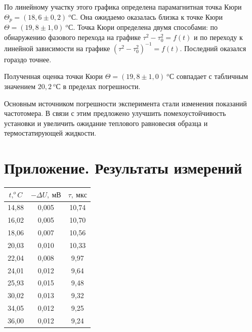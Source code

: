 \documentclass{article}
\begin{document}
	По линейному участку этого графика определена парамагнитная точка Кюри $\Theta_p = (18,6 \pm 0,2) \ ^oС  $. Она ожидаемо оказалась близка к точке Кюри $\Theta = (19,8 \pm 1,0) \ ^oС$. Точка Кюри определена двумя способами: по обнаружению фазового перехода на графике $\tau^2 - \tau_0^2 =  f(t)$ и по переходу к линейной зависимости на графике $(\tau^2 - \tau_0^2) ^{-1} =  f(t)$. Последний оказался гораздо точнее. 
	
	Полученная оценка точки Кюри $\Theta = (19,8 \pm 1,0) \ ^oС$ совпадает с табличным значением $20,2\ ^oС$ в пределах погрешности.
	
	Основным источником погрешности эксперимента стали изменения показаний частотомера. В связи с этим предложено улучшить помехоустойчивость установки и увеличить ожидание теплового равновесия образца и термостатирующей жидкости.   




\section{Приложение. Результаты измерений}




\begin{table}[h!]
	
	\centering
	\begin{tabular}{|c|c|c|}
		\hline
		$t, ^oC$ & $- \Delta U, \ мВ$ & $\tau, \ мкс$ \\
		\hline
		14,88 & 0,005 & 10,74 \\
		\hline
		16,02 & 0,005 & 10,70 \\
		\hline
		18,06 & 0,007 & 10,56 \\
		\hline
		20,03 & 0,010 & 10,33 \\
		\hline
		22,04 & 0,008 & 9,97 \\
		\hline
		24,01 & 0,012 & 9,64 \\
		\hline
		25,93 & 0,015 & 9,48 \\
		\hline
		30,02 & 0,013 & 9,32 \\
		\hline
		34,05 & 0,012 & 9,25 \\
		\hline
		36,00 & 0,012 & 9,24 \\
		\hline
	\end{tabular}
\end{table}
\end{document}
